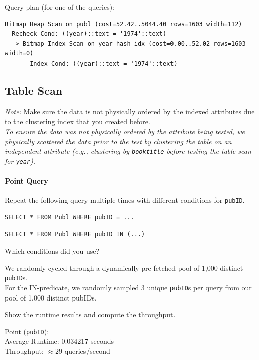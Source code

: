 \documentclass[11pt]{scrartcl}
\begin{document}
Query plan (for one of the queries):

{\small
\parskip0pt\begin{verbatim}
Bitmap Heap Scan on publ (cost=52.42..5044.40 rows=1603 width=112)
  Recheck Cond: ((year)::text = '1974'::text)
  -> Bitmap Index Scan on year_hash_idx (cost=0.00..52.02 rows=1603 width=0)
       Index Cond: ((year)::text = '1974'::text)
\end{verbatim}}

\subsection*{Table Scan}

\emph{Note:} Make sure the data is not physically ordered by the indexed attributes due to the clustering index that you created before. \\
\emph{To ensure the data was not physically ordered by the attribute being tested, we physically scattered the data prior to the test by clustering the table on an independent attribute (e.g., clustering by \texttt{booktitle} before testing the table scan for \texttt{year}).}

\paragraph{Point Query}

Repeat the following query multiple times with different conditions for \texttt{pubID}.

\begin{lstlisting}[style=dbtsql]
SELECT * FROM Publ WHERE pubID = ...
\end{lstlisting}

\begin{lstlisting}[style=dbtsql]
SELECT * FROM Publ WHERE pubID IN (...)
\end{lstlisting}


Which conditions did you use?

We randomly cycled through a dynamically pre-fetched pool of 1,000 distinct \texttt{pubID}s. \\
For the IN-predicate, we randomly sampled 3 unique \texttt{pubID}s per query from our pool of 1,000 distinct pubIDs.

Show the runtime results and compute the throughput.

Point (\texttt{pubID}): \\
Average Runtime: 0.034217 seconds \\
Throughput: $\approx 29$ queries/second
\end{document}
